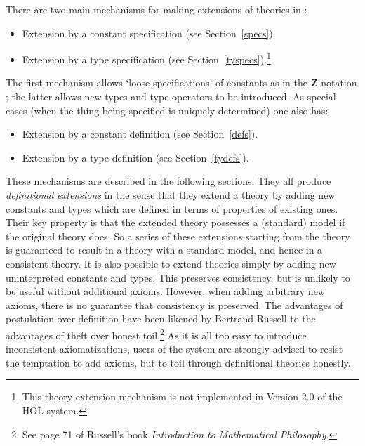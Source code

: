 There are two main mechanisms for making extensions of theories in \HOL:
\begin{itemize}

\item Extension by a constant specification   (see Section~\ref{specs}).

\item Extension by a type specification (see
Section~\ref{tyspecs}).\footnote{This theory extension mechanism is
not implemented in Version 2.0 of the HOL system.}

\end{itemize}
The first mechanism allows `loose specifications' of constants as in
the {\bf Z} notation \cite{Z}; the
latter allows new types and type-operators to be introduced.  As
special cases (when the thing being specified is uniquely determined)
one also has:
\begin{itemize}

\item Extension by a constant definition (see Section~\ref{defs}).

\item Extension by a type definition (see Section~\ref{tydefs}).

\end{itemize}
These mechanisms are described in the following sections. They all
produce {\it definitional extensions\/} in the sense that they extend
a theory by adding new constants and types which are defined in terms
of properties of existing ones. Their key property is that the
extended theory possesses a (standard) model if the original theory
does. So a series of these extensions starting from the theory
 is guaranteed to result in a theory with a standard
model, and hence in a consistent theory. It is also possible to extend
theories simply by adding new uninterpreted constants and types. This
preserves consistency, but is unlikely to be useful without additional
axioms. However, when adding arbitrary new
axioms, there is no guarantee
that consistency is preserved. The advantages of postulation over
definition have been likened by Bertrand Russell to the advantages of
theft over honest toil.\footnote{See page 71 of Russell's book {\sl
Introduction to Mathematical Philosophy\/}.} As it is all too easy to
introduce inconsistent axiomatizations, users of the \HOL{} system are
strongly advised to resist the temptation to add axioms, but to toil
through definitional theories honestly.





